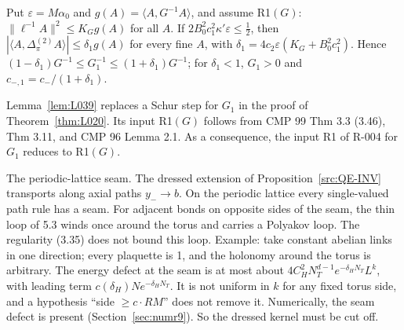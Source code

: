 \begin{lemma}[Lemma R]\label{lem:L039}
Put $\varepsilon=M\alpha_0$ and $g(A)=\langle A,G^{-1}A\rangle$, and assume R1$(G)$: $\|\ell^{-1}A\|^2\le K_Gg(A)$ for all $A$. If $2B_0^2c_1^2\kappa'\varepsilon\le\frac12$, then $|\langle A,\Delta_\pi^{(2)}A\rangle|\le\delta_1g(A)$ for every fine $A$, with $\delta_1=4c_2\varepsilon(K_G+B_0^2c_1^2)$. Hence $(1-\delta_1)G^{-1}\le G_1^{-1}\le(1+\delta_1)G^{-1}$; for $\delta_1<1$, $G_1>0$ and $c_{-,1}=c_-/(1+\delta_1)$.
\end{lemma}
Lemma~\ref{lem:L039} replaces a Schur step for $G_1$ in the proof of Theorem~\ref{thm:L020}. Its input R1$(G)$ follows from CMP 99 Thm 3.3 (3.46), Thm 3.11, and CMP 96 Lemma 2.1. As a consequence, the input R1 of R-004 for $G_1$ reduces to R1$(G)$.

The periodic-lattice seam. The dressed extension of Proposition~\ref{src:QE-INV} transports along axial paths $y_-\to b$. On the periodic lattice every single-valued path rule has a seam. For adjacent bonds on opposite sides of the seam, the thin loop of  5.3 winds once around the torus and carries a Polyakov loop. The regularity (3.35) does not bound this loop. Example: take constant abelian links in one direction; every plaquette is 1, and the holonomy around the torus is arbitrary. The energy defect at the seam is at most about $4C_H^2N_T^{d-1}e^{-\delta_HN_T}L^k$, with leading term $c(\delta_H)Ne^{-\delta_HN_T}$. It is not uniform in $k$ for any fixed torus side, and a hypothesis ``side $\ge c\cdot RM$'' does not remove it. Numerically, the seam defect is present (Section~\ref{sec:numr9}). So the dressed kernel must be cut off.

